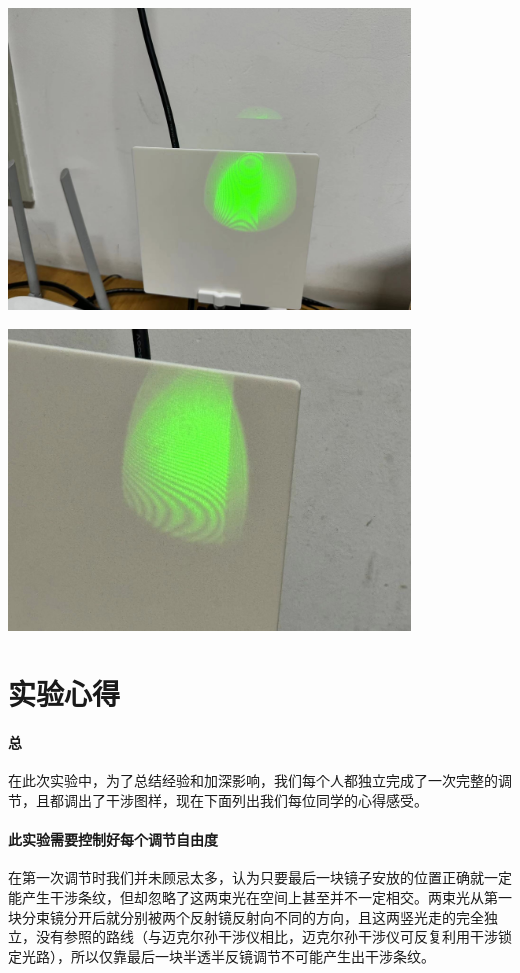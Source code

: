 \documentclass[10pt]{ctexart}
\begin{document}
\begin{minipage}{\textwidth} 
    \includegraphics[width=0.8\textwidth]{其一.jpg}
\end{minipage}
\begin{minipage}{\textwidth} 
    \includegraphics[width=0.8\textwidth]{其二.jpg}
\end{minipage}
\section{实验心得}
\paragraph{总}在此次实验中，为了总结经验和加深影响，我们每个人都独立完成了一次完整的调节，且都调出了干涉图样，现在下面列出我们每位同学的心得感受。
\paragraph{此实验需要控制好每个调节自由度}在第一次调节时我们并未顾忌太多，认为只要最后一块镜子安放的位置正确就一定能产生干涉条纹，但却忽略了这两束光在空间上甚至并不一定相交。两束光从第一块分束镜分开后就分别被两个反射镜反射向不同的方向，且这两竖光走的完全独立，没有参照的路线（与迈克尔孙干涉仪相比，迈克尔孙干涉仪可反复利用干涉锁定光路），所以仅靠最后一块半透半反镜调节不可能产生出干涉条纹。
\end{document}
